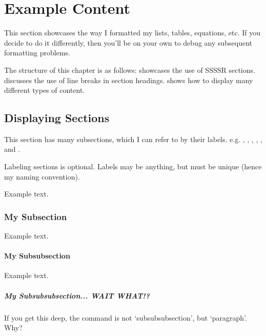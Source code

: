 \chapter{Example Content}
This section showcases the way I formatted my lists, tables, equations, etc. If you decide to do it differently, then you'll be on your own to debug any subsequent formatting problems.

The structure of this chapter is as follows:  showcases the use of SSSSR sections.  discusses the use of line breaks in section headings.  shows how to display many different types of content.


\section{Displaying Sections} \label{sec:mySection}
This section has many subsections, which I can refer to by their labels. e.g. , , , , , and .

Labeling sections is optional. Labels may be anything, but must be unique (hence my naming convention).

Example text.


\subsection{My Subsection} \label{ssec:mySubsection}
Example text.


\subsubsection{My Subsubsection} \label{sssec:ShinySmilyStory}
Example text.


\paragraph{My Subsubsubsection... WAIT WHAT!?} \label{ssssec:SSSSGridman}
If you get this deep, the command is not `subsubsubsection', but `paragraph'. Why?

